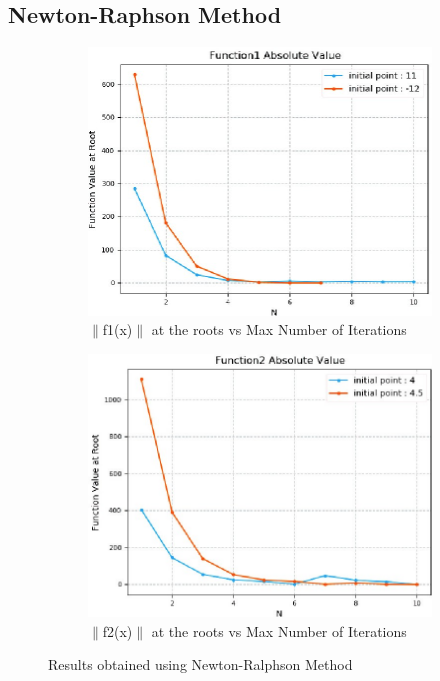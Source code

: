 \documentclass[11pt]{article}
\begin{document}
\subsection{Newton-Raphson Method}
\begin{figure} [h!]
	\centering
	\begin{subfigure}{0.5\textwidth}
		\centering
		\includegraphics[width=\linewidth]{nrm-f1-abs}
		\caption{$\|$f1(x)$\|$ at the roots vs Max Number of Iterations}
		\label{fig2:sub1}
	\end{subfigure}%
	\begin{subfigure}{0.5\textwidth}
		\centering
		\includegraphics[width=\linewidth]{nrm-f2-abs}
		\caption{$\|$f2(x)$\|$ at the roots vs Max Number of Iterations}
		\label{fig2:sub2}
	\end{subfigure}
	\caption{Results obtained using Newton-Ralphson Method}
\end{figure}
\end{document}
